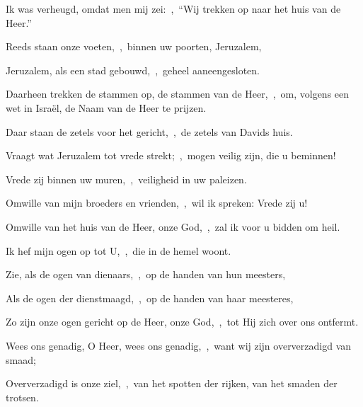 \documentclass[12pt,twoside,a5paper]{article}
\begin{document}

\begin{halfparskip}

  Ik was verheugd, omdat men mij zei:~\sep\ ``Wij trekken op naar het huis van de Heer.''

  Reeds staan onze voeten,~\sep\ binnen uw poorten, Jeruzalem,

  Jeruzalem, als een stad gebouwd,~\sep\ geheel aaneengesloten.

  Daarheen trekken de stammen op, de stammen van de Heer,~\sep\ om, volgens een wet in Israël, de Naam van de Heer te prijzen.

  Daar staan de zetels voor het gericht,~\sep\ de zetels van Davids huis.
\end{halfparskip}

\begin{halfparskip}

  Vraagt wat Jeruzalem tot vrede strekt;~\sep\ mogen veilig zijn, die u beminnen!

  Vrede zij binnen uw muren,~\sep\ veiligheid in uw paleizen.

  Omwille van mijn broeders en vrienden,~\sep\ wil ik spreken: Vrede zij u!

  Omwille van het huis van de Heer, onze God,~\sep\ zal ik voor u bidden om heil.
\end{halfparskip}


\begin{halfparskip}

  Ik hef mijn ogen op tot U,~\sep\ die in de hemel woont.

  Zie, als de ogen van dienaars,~\sep\ op de handen van hun meesters,

  Als de ogen der dienstmaagd,~\sep\ op de handen van haar meesteres,

  Zo zijn onze ogen gericht op de Heer, onze God,~\sep\ tot Hij zich over ons ontfermt.
\end{halfparskip}

\begin{halfparskip}

  Wees ons genadig, O Heer, wees ons genadig,~\sep\ want wij zijn oververzadigd van smaad;

  Oververzadigd is onze ziel,~\sep\ van het spotten der rijken, van het smaden der trotsen.
\end{halfparskip}
\end{document}
